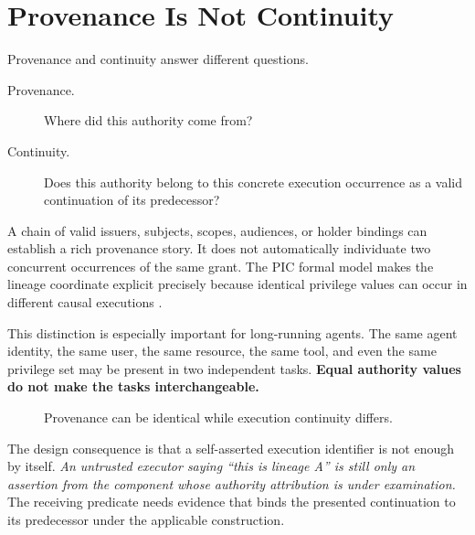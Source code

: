\documentclass[10pt,oneside,openany]{book}
\begin{document}
\chapter{Provenance Is Not Continuity}

Provenance and continuity answer different questions.

\begin{description}
\item[Provenance.] Where did this authority come from?
\item[Continuity.] Does this authority belong to this concrete execution occurrence as a valid continuation of its predecessor?
\end{description}

A chain of valid issuers, subjects, scopes, audiences, or holder bindings can establish a rich provenance story. It does not automatically individuate two concurrent occurrences of the same grant. The PIC formal model makes the lineage coordinate explicit precisely because identical privilege values can occur in different causal executions \cite{gallo2026pic}.

This distinction is especially important for long-running agents. The same agent identity, the same user, the same resource, the same tool, and even the same privilege set may be present in two independent tasks. \textbf{Equal authority values do not make the tasks interchangeable.}

\begin{figure}[ht]
\centering
{}
\caption{Provenance can be identical while execution continuity differs.}
\end{figure}

The design consequence is that a self-asserted execution identifier is not enough by itself. \emph{An untrusted executor saying ``this is lineage A'' is still only an assertion from the component whose authority attribution is under examination.} The receiving predicate needs evidence that binds the presented continuation to its predecessor under the applicable construction.
\end{document}
